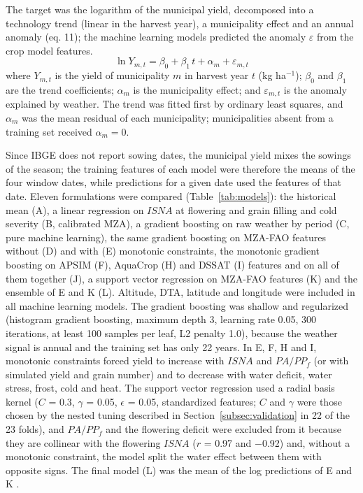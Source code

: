 \documentclass[10pt,a4paper]{article}
\begin{document}
The target was the logarithm of the municipal yield, decomposed into a technology trend (linear in the
harvest year), a municipality effect and an annual anomaly (eq. 11); the machine learning models predicted
the anomaly $\varepsilon$ from the crop model features.
\begin{equation}
\ln Y_{m,t} = \beta_0 + \beta_1\, t + \alpha_m + \varepsilon_{m,t}
\label{eq:target}
\end{equation}
where $Y_{m,t}$ is the yield of municipality $m$ in harvest year $t$ (kg ha$^{-1}$); $\beta_0$ and
$\beta_1$ are the trend coefficients; $\alpha_m$ is the municipality effect; and $\varepsilon_{m,t}$ is
the anomaly explained by weather. The trend was fitted first by ordinary least squares, and $\alpha_m$
was the mean residual of each municipality; municipalities absent from a training set received
$\alpha_m = 0$.

Since IBGE does not report sowing dates, the municipal yield mixes the sowings of the season; the
training features of each model were therefore the means of the four window dates, while predictions
for a given date used the features of that date. Eleven formulations were compared (Table~\ref{tab:models}):
the historical mean (A), a linear regression on $ISNA$ at flowering and grain filling and cold severity
(B, calibrated MZA), a gradient boosting on raw weather by period (C, pure machine learning), the same
gradient boosting on MZA-FAO features without (D) and with (E) monotonic constraints, the monotonic
gradient boosting on APSIM (F), AquaCrop (H) and DSSAT (I) features and on all of them together (J), a
support vector regression on MZA-FAO features (K) and the ensemble of E and K (L). Altitude, DTA,
latitude and longitude were included in all machine learning models. The gradient boosting was shallow
and regularized (histogram gradient boosting, maximum depth 3, learning rate 0.05, 300 iterations, at
least 100 samples per leaf, L2 penalty 1.0), because the weather signal is annual and the training set
has only 22 years. In E, F, H and I, monotonic constraints forced yield to increase with $ISNA$ and
$PA/PP_f$ (or with simulated yield and grain number) and to decrease with water deficit, water stress,
frost, cold and heat. The support vector regression used a radial basis kernel ($C$ = 0.3, $\gamma$ =
0.05, $\epsilon$ = 0.05, standardized features; $C$ and $\gamma$ were those chosen by the nested tuning
described in Section~\ref{subsec:validation} in 22 of the 23 folds), and $PA/PP_f$ and the flowering deficit were excluded
from it because they are collinear with the flowering $ISNA$ ($r$ = 0.97 and $-$0.92) and, without a
monotonic constraint, the model split the water effect between them with opposite signs. The final model
(L) was the mean of the log predictions of E and K \citep{karpatne2017, smola2004, pedregosa2011}.
\end{document}
